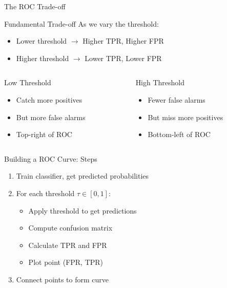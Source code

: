 \documentclass{beamer}
\begin{document}
\begin{frame}{The ROC Trade-off}
\begin{keypointsbox}{Fundamental Trade-off}
\small
As we vary the threshold:
\begin{itemize}
    \item Lower threshold $\rightarrow$ Higher TPR, Higher FPR
    \item Higher threshold $\rightarrow$ Lower TPR, Lower FPR
\end{itemize}
\end{keypointsbox}

\vspace{0.15cm}

\begin{columns}
\begin{column}{0.48\textwidth}
\begin{block}{Low Threshold}
\begin{itemize}
    \item Catch more positives
    \item But more false alarms
    \item Top-right of ROC
\end{itemize}
\end{block}
\end{column}

\begin{column}{0.48\textwidth}
\begin{block}{High Threshold}
\begin{itemize}
    \item Fewer false alarms
    \item But miss more positives
    \item Bottom-left of ROC
\end{itemize}
\end{block}
\end{column}
\end{columns}
\end{frame}

\begin{frame}{Building a ROC Curve: Steps}
\begin{enumerate}
    \item Train classifier, get predicted probabilities

    \vspace{0.15cm}

    \item For each threshold $\tau \in [0, 1]$:
    \begin{itemize}
        \item Apply threshold to get predictions
        \item Compute confusion matrix
        \item Calculate TPR and FPR
        \item Plot point (FPR, TPR)
    \end{itemize}

    \vspace{0.15cm}

    \item Connect points to form curve
\end{enumerate}
\end{frame}
\end{document}
